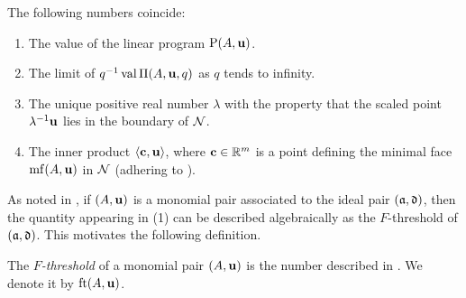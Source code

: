 \documentclass{amsart}
\begin{document}
\begin{proposition}
   \label{FT descriptions: P}
   The following numbers coincide\textup:
   \begin{enumerate}[$(1)$]
      \item\label{value} The value of the linear program $\mathrm{P}(A, \mathbf{u})$.
      \item\label{limit} The limit of $q^{-1}\operatorname{val} \Pi(A,\mathbf{u},q)$ as $q$ tends to infinity.
      \item\label{lambda} The unique positive real number $\lambda$ with the property that the scaled point $\lambda^{-1}\mathbf{u}$ lies in the boundary of $\mathcal{N}$.
      \item\label{new ip} The inner product $\langle \mathbf{c}, \mathbf{u} \rangle$, where $\mathbf{c} \in \mathbb{R}^m$ is a point defining the minimal face $\operatorname{mf}(A, \mathbf{u})$ in $\mathcal{N}$ \textup(adhering to \textup).
   \end{enumerate}
\end{proposition}

As noted in , if $(A,\mathbf{u})$ is a monomial pair associated to the ideal pair $(\mathfrak{a},\mathfrak{d})$, then the quantity appearing in (1) can be described algebraically as the $F$-threshold of $(\mathfrak{a},\mathfrak{d})$.
This motivates the following definition.

\begin{definition}[$F$-threshold]
\label{FT: D}
   The \emph{$F$-threshold} of a monomial pair $(A, \mathbf{u})$ is the number described in .  We denote it by $\operatorname{ft}(A, \mathbf{u})$.
\end{definition}
\end{document}
